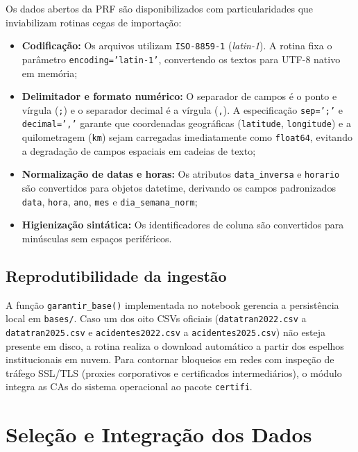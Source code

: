 \documentclass[11pt,a4paper]{article}
\begin{document}
Os dados abertos da PRF são disponibilizados com particularidades que inviabilizam rotinas cegas de importação:
\begin{itemize}
  \item \textbf{Codificação:} Os arquivos utilizam \texttt{ISO-8859-1} (\textit{latin-1}). A rotina fixa o parâmetro \texttt{encoding=}\allowbreak\texttt{'latin-1'}, convertendo os textos para UTF-8 nativo em memória;
  \item \textbf{Delimitador e formato numérico:} O separador de campos é o ponto e vírgula (\texttt{;}) e o separador decimal é a vírgula (\texttt{,}). A especificação \texttt{sep=';'} e \texttt{decimal=','} garante que coordenadas geográficas (\texttt{latitude}, \texttt{longitude}) e a quilometragem (\texttt{km}) sejam carregadas imediatamente como \texttt{float64}, evitando a degradação de campos espaciais em cadeias de texto;
  \item \textbf{Normalização de datas e horas:} Os atributos \texttt{data\_inversa} e \texttt{horario} são convertidos para objetos datetime, derivando os campos padronizados \texttt{data}, \texttt{hora}, \texttt{ano}, \texttt{mes} e \texttt{dia\_semana\_norm};
  \item \textbf{Higienização sintática:} Os identificadores de coluna são convertidos para minúsculas sem espaços periféricos.
\end{itemize}

\subsection{Reprodutibilidade da ingestão}

A função \texttt{garantir\_base()} implementada no notebook gerencia a persistência local em \texttt{bases/}. Caso um dos oito CSVs oficiais (\texttt{datatran2022.csv} a \texttt{datatran2025.csv} e \texttt{acidentes2022.csv} a \texttt{acidentes2025.csv}) não esteja presente em disco, a rotina realiza o download automático a partir dos espelhos institucionais em nuvem. Para contornar bloqueios em redes com inspeção de tráfego SSL/TLS (proxies corporativos e certificados intermediários), o módulo integra as CAs do sistema operacional ao pacote \texttt{certifi}.

\section{Seleção e Integração dos Dados}
\end{document}
